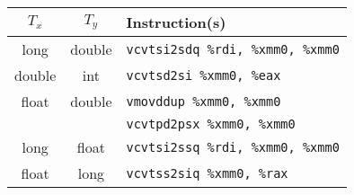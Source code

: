 \documentclass{article}
\begin{document}
\begin{tabular}{c c l}
	$T_x$ & $T_y$ & Instruction(s) \\
	\hline
	long & double & \texttt{vcvtsi2sdq \%rdi, \%xmm0, \%xmm0} \\
	double & int & \texttt{vcvtsd2si \%xmm0, \%eax} \\
	float & double & \texttt{vmovddup \%xmm0, \%xmm0} \\
	&& \texttt{vcvtpd2psx \%xmm0, \%xmm0} \\
	long & float & \texttt{vcvtsi2ssq \%rdi, \%xmm0, \%xmm0} \\
	float & long & \texttt{vcvtss2siq \%xmm0, \%rax} \\
\end{tabular}
\end{document}
